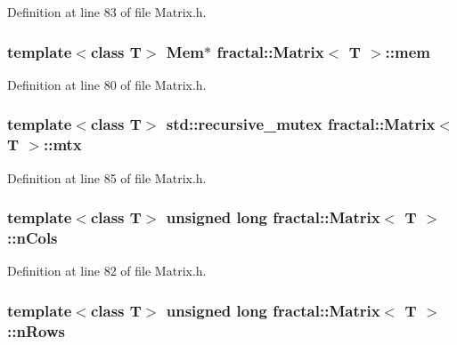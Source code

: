 Definition at line 83 of file Matrix.\+h.

\hypertarget{classfractal_1_1Matrix_a98ec2abf749d3c6d1a525f873e87e681}{
\subsubsection[{mem}]{\setlength{\rightskip}{0pt plus 5cm}template$<$class T$>$ {\bf Mem}$\ast$ {\bf fractal\+::\+Matrix}$<$ T $>$\+::mem\hspace{0.3cm}{\ttfamily [protected]}}}\label{classfractal_1_1Matrix_a98ec2abf749d3c6d1a525f873e87e681}


Definition at line 80 of file Matrix.\+h.

\hypertarget{classfractal_1_1Matrix_ab062a0299275e1daf43287422ba381f6}{
\subsubsection[{mtx}]{\setlength{\rightskip}{0pt plus 5cm}template$<$class T$>$ std\+::recursive\+\_\+mutex {\bf fractal\+::\+Matrix}$<$ T $>$\+::mtx\hspace{0.3cm}{\ttfamily [protected]}}}\label{classfractal_1_1Matrix_ab062a0299275e1daf43287422ba381f6}


Definition at line 85 of file Matrix.\+h.

\hypertarget{classfractal_1_1Matrix_a6098a4de6b5fd299195916b99d7f3046}{
\subsubsection[{n\+Cols}]{\setlength{\rightskip}{0pt plus 5cm}template$<$class T$>$ unsigned long {\bf fractal\+::\+Matrix}$<$ T $>$\+::n\+Cols\hspace{0.3cm}{\ttfamily [protected]}}}\label{classfractal_1_1Matrix_a6098a4de6b5fd299195916b99d7f3046}


Definition at line 82 of file Matrix.\+h.

\hypertarget{classfractal_1_1Matrix_a1f328cc516cc0090940aaef4c1511616}{
\subsubsection[{n\+Rows}]{\setlength{\rightskip}{0pt plus 5cm}template$<$class T$>$ unsigned long {\bf fractal\+::\+Matrix}$<$ T $>$\+::n\+Rows\hspace{0.3cm}{\ttfamily [protected]}}}\label{classfractal_1_1Matrix_a1f328cc516cc0090940aaef4c1511616}


